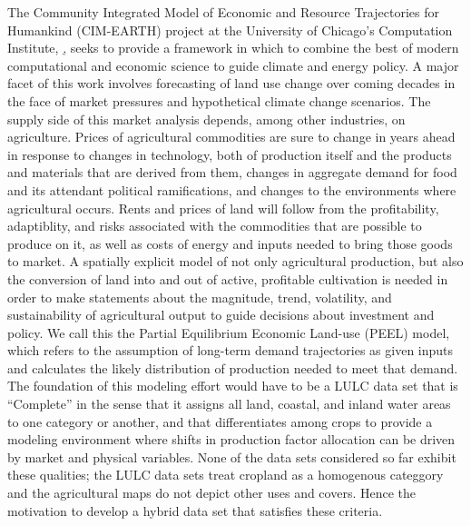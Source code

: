 The Community Integrated Model of Economic and Resource Trajectories
for Humankind (CIM-EARTH) project at the University of Chicago's
Computation Institute, \href{http://www.cimearth.org/}, seeks to
provide a framework in which to combine the best of modern
computational and economic science to guide climate and energy policy.
A major facet of this work involves forecasting of land use change
over coming decades in the face of market pressures and hypothetical
climate change scenarios.  The supply side of this market analysis
depends, among other industries, on agriculture.  Prices of
agricultural commodities are sure to change in years ahead in response
to changes in technology, both of production itself and the products
and materials that are derived from them, changes in aggregate demand
for food and its attendant political ramifications, and changes to the
environments where agricultural occurs.  Rents and prices of land will
follow from the profitability, adaptiblity, and risks associated with
the commodities that are possible to produce on it, as well as costs
of energy and inputs needed to bring those goods to market.  A
spatially explicit model of not only agricultural production, but also
the conversion of land into and out of active, profitable cultivation
is needed in order to make statements about the magnitude, trend,
volatility, and sustainability of agricultural output to guide
decisions about investment and policy.  We call this the Partial
Equilibrium Economic Land-use (PEEL) model, which refers to the
assumption of long-term demand trajectories as given inputs and
calculates the likely distribution of production needed to meet that
demand.  The foundation of this modeling effort would have to be a
LULC data set that is ``Complete'' in the sense that it assigns all
land, coastal, and inland water areas to one category or another, and
that differentiates among crops to provide a modeling environment
where shifts in production factor allocation can be driven by market
and physical variables.  None of the data sets considered so far
exhibit these qualities; the LULC data sets treat cropland as a
homogenous categgory and the agricultural maps do not depict other
uses and covers.  Hence the motivation to develop a hybrid data set
that satisfies these criteria.

